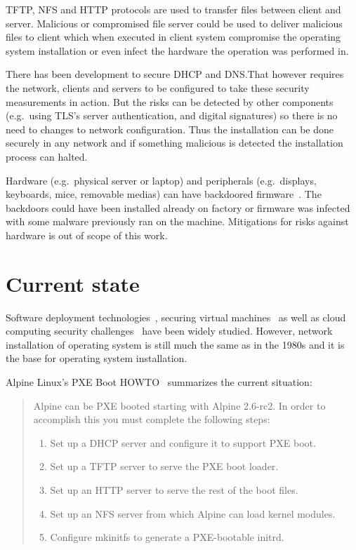 TFTP, NFS and HTTP protocols are used to transfer files between client
and server. Malicious or compromised file server could be used to
deliver malicious files to client which when executed in client system
compromise the operating system installation or even infect the
hardware the operation was performed in.

There has been development to secure DHCP and DNS.\@ That however
requires the network, clients and servers to be configured to take
these security measurements in action. But the risks can be detected
by other components (e.g.\ using TLS's server authentication, and
digital signatures) so there is no need to changes to network
configuration. Thus the installation can be done securely in any
network and if something malicious is detected the installation
process can halted.


Hardware (e.g.\ physical server or laptop) and peripherals (e.g.\
displays, keyboards, mice, removable medias) can have backdoored
firmware~\cite{swierczynski2016interdiction}. The backdoors could have
been installed already on factory or firmware was infected with some
malware previously ran on the machine. Mitigations for risks against
hardware is out of scope of this work.


\section{Current state}

Software deployment technologies~\cite{SoftDep}, securing virtual
machines~\cite{Garfinkel2005} as well as cloud computing security
challenges~\cite{Owens2010}\cite{Hashizume2013} have been widely
studied. However, network installation of operating system is still
much the same as in the 1980s and it is the base for operating system installation.

Alpine Linux's PXE Boot HOWTO~\cite{alpine-pxe-boot-howto} summarizes
the current situation:

\begin{quote}
Alpine can be PXE booted starting with Alpine 2.6-rc2. In order to
accomplish this you must complete the following steps:

\begin{enumerate}
\item Set up a DHCP server and configure it to support PXE boot.
\item Set up a TFTP server to serve the PXE boot loader.
\item Set up an HTTP server to serve the rest of the boot files.
\item Set up an NFS server from which Alpine can load kernel modules.
\item Configure mkinitfs to generate a PXE-bootable initrd.
\end{enumerate}
\end{quote}

